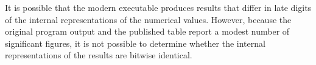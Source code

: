 It is possible that the modern executable produces results that differ in late digits of the internal representations of the numerical values.  However, because the original program output and the published table report a modest number of significant figures, it is not possible to determine whether the internal representations of the results are bitwise identical.



